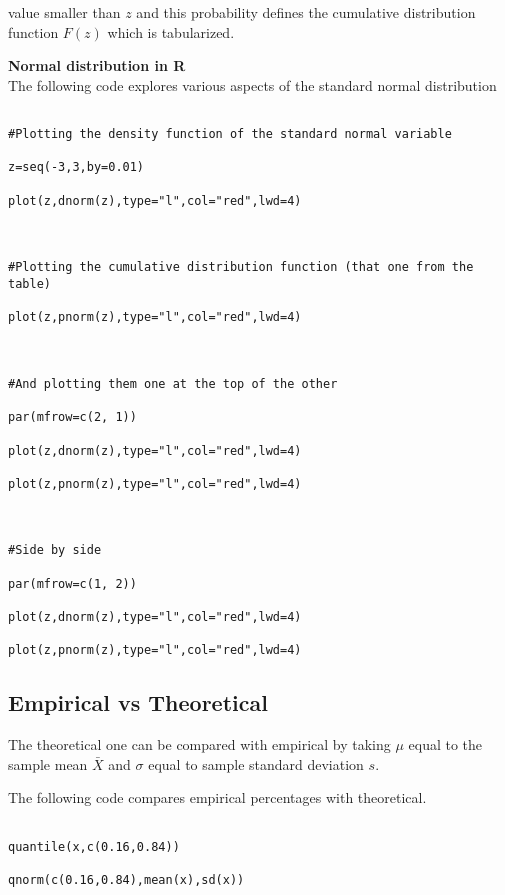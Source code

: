 value smaller than $z$ and this probability defines the cumulative distribution function $F(z)$ which is tabularized.

 



\textbf{Normal distribution in R}\\

The following code explores various aspects of the standard normal distribution

 

\begin{verbatim}

#Plotting the density function of the standard normal variable

z=seq(-3,3,by=0.01)

plot(z,dnorm(z),type="l",col="red",lwd=4)

 

#Plotting the cumulative distribution function (that one from the table)

plot(z,pnorm(z),type="l",col="red",lwd=4)

 

#And plotting them one at the top of the other

par(mfrow=c(2, 1))

plot(z,dnorm(z),type="l",col="red",lwd=4)

plot(z,pnorm(z),type="l",col="red",lwd=4)

 

#Side by side

par(mfrow=c(1, 2))

plot(z,dnorm(z),type="l",col="red",lwd=4)

plot(z,pnorm(z),type="l",col="red",lwd=4)

\end{verbatim}

 

\subsection{Empirical vs Theoretical}

The theoretical one can be compared with empirical by taking $\mu$ equal to the sample mean $\bar{X}$ and $\sigma$  equal to sample standard deviation $s$.

The following code compares empirical percentages with theoretical.

\begin{verbatim}

quantile(x,c(0.16,0.84))

qnorm(c(0.16,0.84),mean(x),sd(x))

\end{verbatim}

